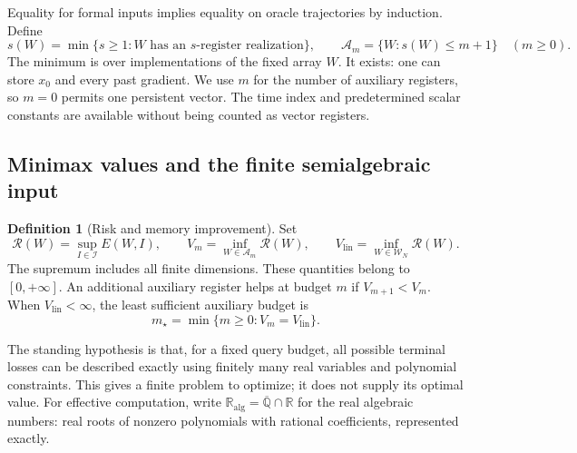 \documentclass[11pt]{article}
\numberwithin{equation}{section}
\theoremstyle{definition}
\newtheorem{definition}[theorem]{Definition}
\newcommand{\R}{\mathbb R}
\newcommand{\K}{\mathbb R_{\mathrm{alg}}}
\newcommand{\W}{\mathcal W_N}
\newcommand{\A}{\mathcal A}
\newcommand{\risk}{\mathcal R}
\begin{document}
Equality for formal inputs implies equality on oracle trajectories by induction. Define
\begin{equation}
 s(W)=\min\{s\ge1:W\text{ has an }s\text{-register realization}\},
 \qquad
 \A_m=\{W:s(W)\le m+1\}\quad(m\ge0).
 \label{eq:memory-class}
\end{equation}
The minimum is over implementations of the fixed array $W$. It exists: one can store $x_0$ and every past gradient. We use $m$ for the number of auxiliary registers, so $m=0$ permits one persistent vector. The time index and predetermined scalar constants are available without being counted as vector registers.

\subsection{Minimax values and the finite semialgebraic input}
\begin{definition}[Risk and memory improvement]\label{def:values}
Set
\begin{equation}
 \risk(W)=\sup_{I\in\mathscr I}E(W,I),\qquad
 V_m=\inf_{W\in\A_m}\risk(W),\qquad
 V_{\mathrm{lin}}=\inf_{W\in\W}\risk(W).
 \label{eq:values}
\end{equation}
The supremum includes all finite dimensions. These quantities belong to $[0,+\infty]$. An additional auxiliary register helps at budget $m$ if $V_{m+1}<V_m$. When $V_{\mathrm{lin}}<\infty$, the least sufficient auxiliary budget is
\begin{equation}
 m_\star=\min\{m\ge0:V_m=V_{\mathrm{lin}}\}.
 \label{eq:mstar}
\end{equation}
\end{definition}

\newpage
The standing hypothesis is that, for a fixed query budget, all possible terminal losses can be described exactly using finitely many real variables and polynomial constraints. This gives a finite problem to optimize; it does not supply its optimal value. For effective computation, write $\K=\overline{\mathbb Q}\cap\R$ for the real algebraic numbers: real roots of nonzero polynomials with rational coefficients, represented exactly.
\end{document}
